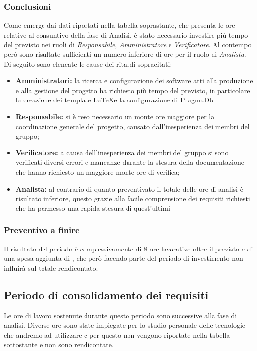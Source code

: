 \subsubsection{Conclusioni}
Come emerge dai dati riportati nella tabella soprastante, che presenta le ore relative al consuntivo della fase di Analisi, è stato necessario investire più tempo del previsto nei ruoli di \textit{Responsabile}, \textit{Amministratore} e \textit{Verificatore}.  Al contempo però sono risultate sufficienti
un numero inferiore di ore per il ruolo di \textit{Analista}. 
Di seguito sono elencate le cause dei ritardi sopracitati:
\begin{itemize}
	\item \textbf{Amministratori:} la ricerca e configurazione dei software atti alla produzione e alla gestione del progetto ha richiesto più tempo del previsto, in particolare la creazione dei template \LaTeX\space e la configurazione di PragmaDb\glo;\
	\item \textbf{Responsabile:} si è reso necessario un monte ore maggiore per la coordinazione generale del progetto, causato dall'inesperienza dei membri del gruppo; 
	\item \textbf{Verificatore:} a causa dell'inesperienza dei membri del gruppo si sono verificati diversi errori e mancanze durante la stesura della documentazione che hanno richiesto un maggiore monte ore di verifica;
	\item \textbf{Analista:} al contrario di quanto preventivato il totale delle ore di analisi è risultato inferiore, questo grazie alla facile comprensione dei requisiti richiesti che ha permesso una rapida stesura di quest'ultimi.
\end{itemize}

\subsubsection{Preventivo a finire}
Il risultato del periodo è complessivamente di 8 ore lavorative oltre il previsto e di una
spesa aggiunta di \EUR{+145,00}, che però facendo parte del periodo di investimento
non influirà sul totale rendicontato.

\subsection{Periodo di consolidamento dei requisiti}
Le ore di lavoro sostenute durante questo periodo sono successive alla fase di analisi. Diverse ore sono state impiegate per lo studio personale delle tecnologie che andremo ad utilizzare e per questo non vengono riportate nella tabella sottostante e non sono rendicontate.



